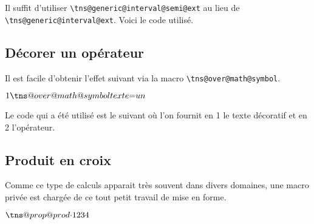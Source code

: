 \documentclass[12pt,a4paper]{article}
\newcommand\env[1]{\texttt{#1}}
\newcommand\macro[1]{\env{\textbackslash{}#1}}
\theoremstyle{definition}
\begin{document}
{{{{{{{{{{{Il suffit d'utiliser \macro{tns@generic@interval@semi@ext} au lieu de \macro{tns@generic@interval@ext}. Voici le code utilisé.

\begin{latexex-alone}
\newcommand\myinter[2]{%
    \tns@generic@interval@semi@ext{\{}%
                                  {#1}{::}{#2}%
                                  {)}%
}
\end{latexex-alone}



\subsection{Décorer un opérateur}

Il est facile d'obtenir l'effet suivant via la macro \macro{tns@over@math@symbol}.

\makeatletter
\newcommand\eqtxt{\tns@over@math@symbol{texte}{=}}
\makeatother

\begin{latexex}
$1 \eqtxt un$
\end{latexex}


Le code qui a été utilisé est le suivant où l'on fournit en 1\ier{} le texte décoratif et en 2\ieme{} l'opérateur.


\begin{latexex-alone}
\newcommand\eqtxt{\tns@over@math@symbol{texte}{=}}
\end{latexex-alone}



\subsection{Produit en croix}

Comme ce type de calculs apparait très souvent dans divers domaines, une macro privée est chargée de ce tout petit travail de mise en forme.

\begin{latexex}
\makeatletter
$\tns@prop@prod{\cdot} %
               {1}{2}  %
               {3}{4}$ %
\makeatother
\end{latexex}


}}}}}}}}}}}
\end{document}
